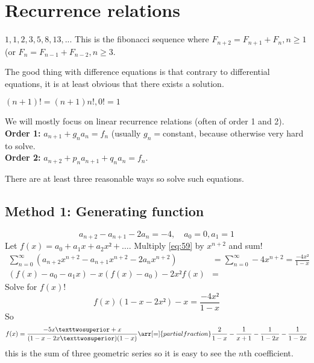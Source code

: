 \documentclass[english]{lbscript}
\begin{document}
\section{Recurrence relations}

\begin{example}{}{}
  \(1,1,2,3,5,8,13,...\) This is the fibonacci sequence where \(F_{n+2}=F_{n+1}+F_{n}, n≥1\) (or \(F_n=F_{n-1}+F_{n-2}, n≥3\).
\end{example}
The good thing with difference equations is that contrary to differential equations, it is at least obvious that there exists a solution.


\begin{example}{}{}
  \((n+1)! = (n+1)n!, 0!=1\)
\end{example}

We will mostly focus on linear recurrence relations (often of order 1 and 2).\\
\textbf{Order 1:} \(a_{n+1} + g_n a_n = f_n\) (usually \(g_n=\)constant, because otherwise very hard to solve.\\
\textbf{Order 2:} \(a_{n+2} + p_n a_{n+1} + q_n a_n=f_n\).

There are at least three reasonable ways so solve such equations.


\subsection{Method 1: Generating function}
\label{sec:method-1:-generating}
\begin{example}{}{}
  \begin{equation}
    \label{eq:59}
    a_{n+2} - a_{n+1} - 2a_n = -4, \quad a_0=0, a_1=1
  \end{equation}
  Let \(f(x)=a_0+a_1x+a_2x²+\dots\). Multiply \cref{eq:59} by \(x^{n+2}\) and sum!
  \begin{align}
    \label{eq:54}
    ∑_{n=0}^{∞} \left( a_{n+2}x^{n+2} - a_{n+1} x^{n+2} - 2a_n x^{n+2} \right)
                                                                          & = ∑_{n=0}^{∞} -4 x^{n+2}
    = \frac{-4x²}{1-x}                                                                               \\
    \left(f(x) - a_0 - a_1x \right) - x\left(f(x) - a_0 \right) - 2x²f(x) & =
  \end{align}
  Solve for \(f(x)\)!
  \begin{equation}
    \label{eq:60}
    f(x) \left(1-x-2x² \right)  - x = \frac{-4x²}{1-x}
  \end{equation}
  So
  \begin{equation}
    \label{eq:61}
    f(x) = \frac{-5x²+x}{(1-x-2x²)(1-x)} \arr[=]{partial fraction} \frac{2}{1-x} - \frac{1}{x+1} - \frac{1}{1-2x} - \frac{1}{1-2x}
  \end{equation}
  this is the sum of three geometric series so it is easy to see the \(n\)th coefficient.
\end{example}
\end{document}
